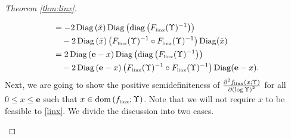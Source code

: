 \documentclass[smallextended]{svjour3hack}       %
\DeclareMathOperator{\Diag}{Diag}
\DeclareMathOperator{\diag}{diag}
\DeclareMathOperator{\dom}{dom}
\begin{document}
\begin{proof}[Theorem \ref{thm:linx}]
\begin{itemize}
\begin{align*}
        & ~= -2 \Diag\left(\check{x}\right) \Diag\left(\diag\left(F_{{\tiny\mbox{linx}}}(\Upsilon)^{-1}\right)\right) \\
        &\quad ~-2  \Diag\left(\check{x}\right)   \left(F_{{\tiny\mbox{linx}}}(\Upsilon)^{-1}\circ F_{{\tiny\mbox{linx}}}(\Upsilon)^{-1}\right) \Diag(\check{x})\\
        &~ =2 \Diag\left(\mathbf{e}-x\right) \Diag\left(\diag\left(F_{{\tiny\mbox{linx}}}(\Upsilon)^{-1}\right)\right) \\
        &\quad ~ - 2  \Diag\left(\mathbf{e}-x\right)   \left(F_{{\tiny\mbox{linx}}}(\Upsilon)^{-1}\circ F_{{\tiny\mbox{linx}}}(\Upsilon)^{-1}\right) \Diag(\mathbf{e}-x).
    \end{align*}
\smallskip
    Next, we are going to show the positive semidefiniteness of $\frac{\partial^2 f_{{\tiny\mbox{linx}}}\left(x;\Upsilon\right)}{\partial \left(\log \Upsilon\right) ^2} $ for all $0\le x \le \mathbf{e}$ such that $x\in \dom\left(f_{{\tiny\mbox{linx}}};\Upsilon\right)$. Note that we will not require $x$ to be feasible to \ref{linx}. We divide the discussion into two cases.


\end{itemize}
\end{proof}
\end{document}
